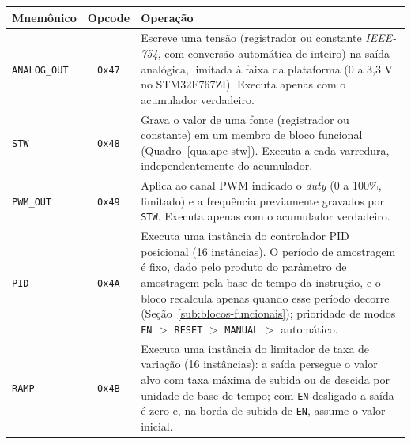 \begin{quadrofixo}
    \centering
    \begin{tabular}{|l|c|p{9.4cm}|}
        \hline
        Mnemônico & Opcode & Operação \\
        \hline
        \texttt{ANALOG\_OUT} & \texttt{0x47} & Escreve uma tensão (registrador ou constante \textit{IEEE-754}, com conversão automática de inteiro) na saída analógica, limitada à faixa da plataforma (0 a 3,3 V no STM32F767ZI). Executa apenas com o acumulador verdadeiro. \\
        \hline
        \texttt{STW} & \texttt{0x48} & Grava o valor de uma fonte (registrador ou constante) em um membro de bloco funcional (Quadro~\ref{qua:ape-stw}). Executa a cada varredura, independentemente do acumulador. \\
        \hline
        \texttt{PWM\_OUT} & \texttt{0x49} & Aplica ao canal PWM indicado o \textit{duty} (0 a 100\%, limitado) e a frequência previamente gravados por \texttt{STW}. Executa apenas com o acumulador verdadeiro. \\
        \hline
        \texttt{PID} & \texttt{0x4A} & Executa uma instância do controlador PID posicional (16 instâncias). O período de amostragem é fixo, dado pelo produto do parâmetro de amostragem pela base de tempo da instrução, e o bloco recalcula apenas quando esse período decorre (Seção~\ref{sub:blocos-funcionais}); prioridade de modos \texttt{EN} $>$ \texttt{RESET} $>$ \texttt{MANUAL} $>$ automático. \\
        \hline
        \texttt{RAMP} & \texttt{0x4B} & Executa uma instância do limitador de taxa de variação (16 instâncias): a saída persegue o valor alvo com taxa máxima de subida ou de descida por unidade de base de tempo; com \texttt{EN} desligado a saída é zero e, na borda de subida de \texttt{EN}, assume o valor inicial. \\
        \hline
    \end{tabular}
    \label{qua:ape-blocos}
\end{quadrofixo}
